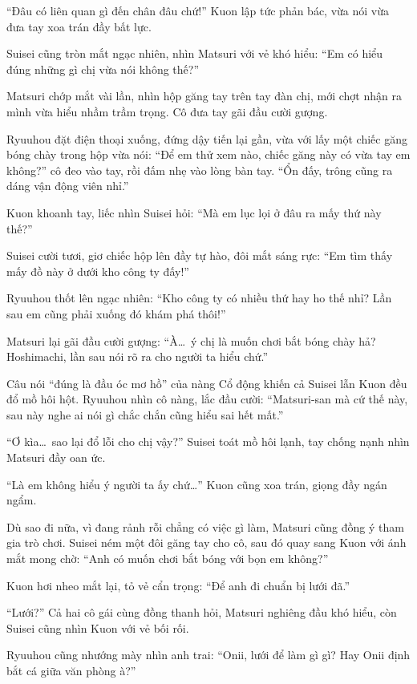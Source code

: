 \documentclass[../main.tex]{subfiles}
\begin{document}
``Đâu có liên quan gì đến chân đâu chứ!'' Kuon lập tức phản bác, vừa nói vừa đưa tay xoa trán đầy bất lực.

Suisei cũng tròn mắt ngạc nhiên, nhìn Matsuri với vẻ khó hiểu: ``Em có hiểu đúng những gì chị vừa nói không thế?''

Matsuri chớp mắt vài lần, nhìn hộp găng tay trên tay đàn chị, mới chợt nhận ra mình vừa hiểu nhầm trầm trọng. Cô đưa tay gãi đầu cười gượng.

Ryuuhou đặt điện thoại xuống, đứng dậy tiến lại gần, vừa với lấy một chiếc găng bóng chày trong hộp vừa nói: ``Để em thử xem nào, chiếc găng này có vừa tay em không?'' cô đeo vào tay, rồi đấm nhẹ vào lòng bàn tay. ``Ổn đấy, trông cũng ra dáng vận động viên nhỉ.''

Kuon khoanh tay, liếc nhìn Suisei hỏi: ``Mà em lục lọi ở đâu ra mấy thứ này thế?''

Suisei cười tươi, giơ chiếc hộp lên đầy tự hào, đôi mắt sáng rực: ``Em tìm thấy mấy đồ này ở dưới kho công ty đấy!''

Ryuuhou thốt lên ngạc nhiên: ``Kho công ty có nhiều thứ hay ho thế nhỉ? Lần sau em cũng phải xuống đó khám phá thôi!''

Matsuri lại gãi đầu cười gượng: ``À\dots\ ý chị là muốn chơi bắt bóng chày hả? Hoshimachi, lần sau nói rõ ra cho người ta hiểu chứ.''

Câu nói ``đúng là đầu óc mơ hồ'' của nàng Cổ động khiến cả Suisei lẫn Kuon đều đổ mồ hôi hột. Ryuuhou nhìn cô nàng, lắc đầu cười: ``Matsuri-san mà cứ thế này, sau này nghe ai nói gì chắc chắn cũng hiểu sai hết mất.''

``Ơ kìa\dots\ sao lại đổ lỗi cho chị vậy?'' Suisei toát mồ hôi lạnh, tay chống nạnh nhìn Matsuri đầy oan ức.

``Là em không hiểu ý người ta ấy chứ\dots'' Kuon cũng xoa trán, giọng đầy ngán ngẩm.


Dù sao đi nữa, vì đang rảnh rỗi chẳng có việc gì làm, Matsuri cũng đồng ý tham gia trò chơi. Suisei ném một đôi găng tay cho cô, sau đó quay sang Kuon với ánh mắt mong chờ: ``Anh có muốn chơi bắt bóng với bọn em không?''

Kuon hơi nheo mắt lại, tỏ vẻ cẩn trọng: ``Để anh đi chuẩn bị lưới đã.''

``Lưới?'' Cả hai cô gái cùng đồng thanh hỏi, Matsuri nghiêng đầu khó hiểu, còn Suisei cũng nhìn Kuon với vẻ bối rối.

Ryuuhou cũng nhướng mày nhìn anh trai: ``Onii, lưới để làm gì gì? Hay Onii định bắt cá giữa văn phòng à?''
\end{document}
